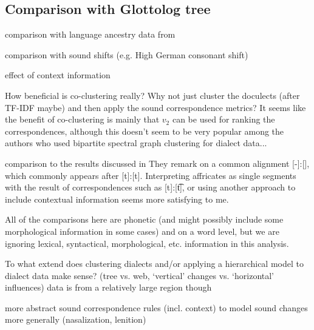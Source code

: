 \documentclass{article}
\begin{document}

\subsection{Comparison with Glottolog tree}
comparison with language ancestry data from \citet{hammarstrom2018glottolog}

comparison with sound shifts (e.g. High German consonant shift)

effect of context information

How beneficial is co-clustering really? Why not just cluster the doculects (after TF-IDF maybe) and then apply the sound correspondence metrics? It seems like the benefit of co-clustering is mainly that $v_2$ can be used for ranking the correspondences, although this doesn't seem to be very popular among the authors who used bipartite spectral graph clustering for dialect data...

comparison to the results discussed in \citet{wieling2011bipartite}
They remark on a common alignment [-]:[\textesh], which commonly appears after [t]:[t]. Interpreting affricates as single segments with the result of correspondences such as [t]:[\t{t\textesh}], or using another approach to include contextual information seems more satisfying to me.


All of the comparisons here are phonetic (and might possibly include some morphological information in some cases) and on a word level, but we are ignoring lexical, syntactical, morphological, etc. information in this analysis.

To what extend does clustering dialects and/or applying a hierarchical model to dialect data make sense? (tree vs. web, `vertical' changes vs. `horizontal' influences)
data is from a relatively large region though

more abstract sound correspondence rules (incl. context) to model sound changes more generally (nasalization, lenition)



\end{document}
